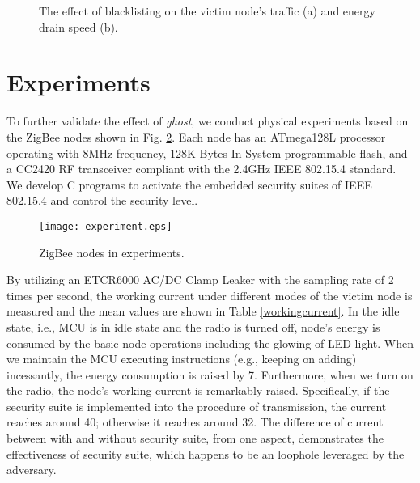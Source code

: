 \documentclass[10pt,journal,cspaper,compsoc]{IEEEtran}
\begin{document}
\begin{figure}[htbp]
\vspace{-2mm}
	\centering
	\hspace{-5mm}
 \vspace{-1mm}
	\caption{The effect of blacklisting on the victim node's traffic (a) and energy drain speed (b).}	
	\label{Fig_bklisting}
\end{figure}

\section{Experiments}\label{experiment}
To further validate the effect of {\em ghost}, we conduct physical experiments based on the ZigBee nodes shown in Fig. \ref{fig_experiment}. Each node has an ATmega128L processor operating with 8MHz frequency, 128K Bytes In-System programmable flash, and a CC2420 RF transceiver compliant with the 2.4GHz IEEE 802.15.4 standard. We develop C programs to activate the embedded security suites of IEEE 802.15.4 and control the security level.

\begin{figure}[!ht]
    \centering
    \texttt{[image: experiment.eps]}
    \caption{ZigBee nodes in experiments.}
    \label{fig_experiment}
\end{figure}

By utilizing an ETCR6000 AC/DC Clamp Leaker with the sampling rate of 2 times per second, the working current under different modes of the victim node is measured and the mean values are shown in Table \ref{workingcurrent}. In the idle state, i.e., MCU is in idle state and the radio is turned off, node's energy is consumed by the basic node operations including the glowing of LED light. When we maintain the MCU executing instructions (e.g., keeping on adding) incessantly, the energy consumption is raised by 7. Furthermore, when we turn on the radio, the node's working current is remarkably raised. Specifically, if the security suite is implemented into the procedure of transmission, the current reaches around 40; otherwise it reaches around 32. The difference of current between with and without security suite, from one aspect, demonstrates the effectiveness of security suite, which happens to be an loophole leveraged by the adversary.
\end{document}
